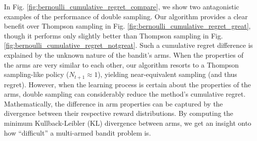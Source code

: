 \documentclass{article}
\begin{document}
In Fig. \ref{fig:bernoulli_cumulative_regret_compare}, we show two antagonistic examples of the performance of double sampling. Our algorithm provides a clear benefit over Thompson sampling in Fig. \ref{fig:bernoulli_cumulative_regret_great}, though it performs only slightly better than Thompson sampling in Fig. \ref{fig:bernoulli_cumulative_regret_notgreat}. Such a cumulative regret difference is explained by the unknown nature of the bandit's arms. When the properties of the arms are very similar to each other, our algorithm resorts to a Thompson sampling-like policy ($N_{t+1}\approx1$), yielding near-equivalent sampling (and thus regret). However, when the learning process is certain about the properties of the arms, double sampling can considerably reduce the method's cumulative regret. Mathematically, the difference in arm properties can be captured by the divergence between their respective reward distributions. By computing the minimum Kullback-Leibler (KL) divergence between arms, we get an insight onto how ``difficult'' a multi-armed bandit problem is.
\end{document}
